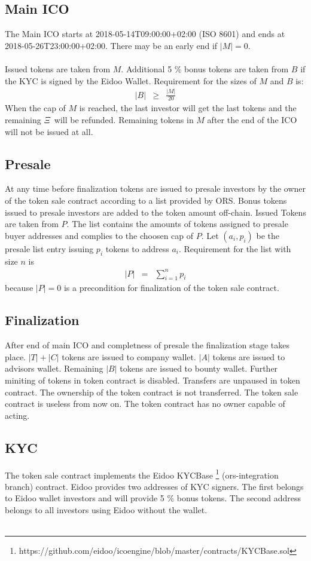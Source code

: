 \documentclass{article}
\newcommand{\ether}{$\Xi$}
\begin{document}
\subsection{Main ICO}
The Main ICO starts at 2018-05-14T09:00:00+02:00 (ISO 8601) and ends at\\
2018-05-26T23:00:00+02:00. There may be an early end if $|M| = 0$.
\\\\ Issued tokens are taken from $M$. Additional 5 \% bonus tokens are taken
from $B$ if the KYC is signed by the Eidoo Wallet. Requirement for the sizes of
$M$ and $B$ is:
\begin{eqnarray}
  |B| & \geq & \frac{|M|}{20} 
  \end{eqnarray}
When the cap of $M$ is
reached, the last investor will get the last tokens and the remaining \ether \
will be refunded.
Remaining tokens in $M$ after the end of the ICO will not be issued at all.
\subsection{Presale}
At any time before finalization tokens are issued to
presale investors by the owner of the token sale contract according to a list
provided by ORS. Bonus tokens issued to presale investors are added to the token
amount off-chain. Issued Tokens are taken from $P$.
The list contains the amounts of tokens
assigned to presale buyer addresses and complies to the choosen cap of
$P$. Let $(a_i,p_i)$ be the presale list entry issuing $p_i$ tokens to address $a_i$.
Requirement for the list with size $n$
is
\begin{eqnarray}
     |P| & = & \sum_{i=1}^n  p_i 
  \end{eqnarray}
because $|P| = 0$ is a precondition for finalization of the token sale contract.


\subsection{Finalization}
After end of main ICO and completness of  presale the
finalization stage takes place. $|T|+|C|$ tokens are issued to company wallet.
$|A|$ tokens are issued to advisors wallet. Remaining $|B|$ tokens are issued to
bounty wallet. Further miniting of tokens in token contract is disabled.
Transfers are unpaused in token contract. The ownership of the token contract is not
transferred. The token sale contract is useless from now on. The token contract
has no owner capable of acting.
\subsection{KYC}
The token sale contract implements the Eidoo KYCBase
\footnote{https://github.com/eidoo/icoengine/blob/master/contracts/KYCBase.sol}
(ors-integration branch) contract. Eidoo provides two addresses of KYC signers.
The first belongs to Eidoo wallet investors and will provide 5 \% bonus tokens. The second address belongs to all investors using Eidoo without the wallet. \\\\
\end{document}
